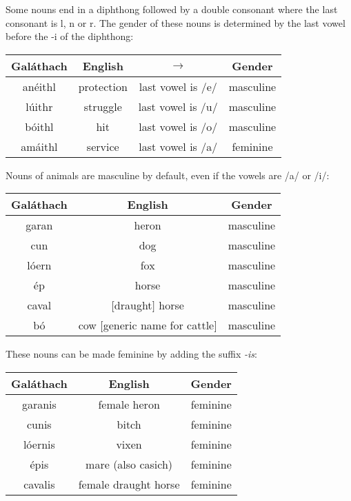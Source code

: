 Some nouns end in a diphthong followed by a double consonant where the last consonant is l, n or r. The gender of these nouns is determined by the last vowel before the -i of the diphthong:
\begin{table}[H]
\centering
\begin{tabu}{c|c|c|c}
  \textbf{Gal\'{a}thach} & \textbf{English} & $\rightarrow$ & \textbf{Gender}\\
  \toprule
  an\'{e}ithl & protection & last vowel is /e/ & masculine\\
  l\'{u}ithr & struggle & last vowel is /u/ & masculine\\
  b\'{o}ithl & hit & last vowel is /o/ & masculine\\
  am\'{a}ithl & service & last vowel is /a/ & feminine
\end{tabu}
\label{example_gender_end_diphthong_double_consonant}
\end{table}

Nouns of animals are masculine by default, even if the vowels are /a/ or /i/:
\begin{table}[H]
\centering
\begin{tabu}{c|c|c}
  \textbf{Gal\'{a}thach} & \textbf{English} & \textbf{Gender}\\
  \toprule
  garan & heron & masculine\\
  cun & dog & masculine\\
  l\'{o}ern & fox & masculine\\
  \'{e}p & horse & masculine\\
  caval & $[$draught$]$ horse & masculine\\
  b\'{o} & cow $[$generic name for cattle$]$ & masculine
\end{tabu}
\label{example_gender_animals}
\end{table}

These nouns can be made feminine by adding the suffix \textit{-is}:
\begin{table}[H]
\centering
\begin{tabu}{c|c|c}
  \textbf{Gal\'{a}thach} & \textbf{English} & \textbf{Gender}\\
  \toprule
  garanis & female heron & feminine\\
  cunis & bitch & feminine\\
  l\'{o}ernis & vixen & feminine\\
  \'{e}pis & mare (also casich) & feminine\\
  cavalis & female draught horse & feminine
\end{tabu}
\label{example_gender_animals_femalize}
\end{table}

